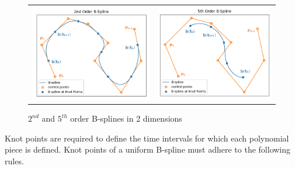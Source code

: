 \documentclass{article}
\begin{document}
\begin{figure}[H]
\begin{tabular}{ll}
\includegraphics[scale=.4]{2ndOrderBspline.png}
&
\includegraphics[scale=.4]{5th Order B-spline.png}
\end{tabular}
\caption{$2^{nd}$ and $5^{th}$ order B-splines in 2 dimensions}
\label{Fig:Uniform B-splines}
\end{figure}

Knot points are required to define the time intervals for which each polynomial piece is defined. Knot points of a uniform B-spline must adhere to the following rules.
\end{document}

